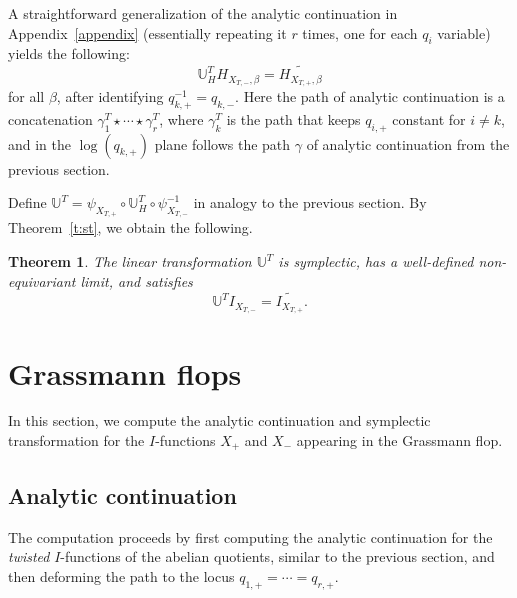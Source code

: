 \documentclass[11pt]{article}
\numberwithin{equation}{section}
\newtheorem{Theorem}{Theorem}[section]
\numberwithin{equation}{section}
\newcommand{\UU}{\mathbb{U}}
\begin{document}
A straightforward generalization of the analytic continuation in Appendix~\ref{appendix} (essentially repeating it $r$ times, one for each $q_i$ variable) yields the following:
\[
\UU_H^T H_{X_{T,-}, \beta} = \widetilde{H_{X_{T,+}, \beta}}
\]
for all $\beta$, after identifying $q_{k, +}^{-1} = q_{k, -}$. Here the path of analytic continuation is a concatenation
$\gamma_1^T \star \cdots \star \gamma_r^T$,
where $\gamma_k^T$ is the path that keeps $q_{i, +}$ constant for $i \neq k$, and in the $ \log(q_{k, +})$ plane follows the path $\gamma$ of analytic continuation from the previous section.

Define
$\UU^T = \psi_{X_{T,+}} \circ \UU_H^T \circ \psi_{X_{T,-}}^{-1}$
in analogy to the previous section. By Theorem~\ref{t:st}, we obtain the following.
\begin{Theorem} %
The linear transformation $\UU^T$ is symplectic, has a well-defined non-equivariant limit, and satisfies
\[
\UU^T I_{X_{T,-}} =\widetilde{I_{X_{T,+}}}.
\]
\end{Theorem}


\section{Grassmann flops}
In this section, we compute the analytic continuation and symplectic transformation for the $I$-functions $X_+$ and $X_-$ appearing in the Grassmann flop.

\subsection{Analytic continuation}
The computation proceeds by first computing the analytic continuation for the \emph{twisted} $I$-functions of the abelian quotients, similar to the previous section, and then deforming the path to the locus $q_{1, +} = \cdots = q_{r, +}$.
\end{document}
